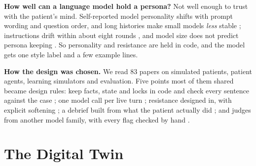 \documentclass[conference]{IEEEtran}
\begin{document}
\textbf{How well can a language model hold a persona?} Not well enough to trust with the patient's mind. Self-reported model personality
shifts with prompt wording and question order, and long histories make small models \emph{less} stable \cite{gupta2023selfassessment,tosato2025persist};
instructions drift within about eight rounds \cite{li2024instruction}, and model size does not predict persona keeping \cite{samuel2025personagym}.
So personality and resistance are held in code, and the model gets one style label and a few example lines.

\textbf{How the design was chosen.} We read 83 papers on simulated patients, patient agents, learning simulators and evaluation. Five points
most of them shared became design rules: keep facts, state and locks in code and check every sentence against the case
\cite{chen2023llmempowered,lai2025patientzero}; one model call per live turn \cite{sabour2026patientact}; resistance designed in, with explicit
softening \cite{steenstra2025scaffolding,lee2025psyche}; a debrief built from what the patient actually did \cite{haut2025ai,brugge2024llm}; and
judges from another model family, with every flag checked by hand \cite{zheng2023judging}.

\section{The Digital Twin}\label{sec:model}
\end{document}
